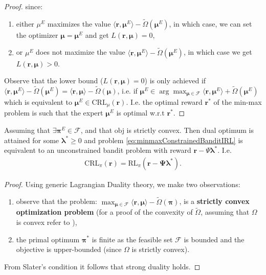 \begin{proof}
    since:
    \begin{enumerate}
        \item either $\mu^E$ maximizes the value $\langle \bm{r}, \bm{\mu}^E \rangle - \tilde{\Omega}(\bm{\mu}^E)$, in which case, we can set the optimizer $\bm{\mu} = \bm{\mu}^E$ and get $ L(\bm{r},\bm{\mu})=0$,
        \item or  $\mu^E$ does not maximize the value $\langle \bm{r}, \bm{\mu}^E\rangle - \tilde{\Omega}(\bm{\mu}^E)$, in  which case we get $ L(\bm{r},\bm{\mu})>0$.
    \end{enumerate}
    Observe that the lower bound ($ L(\bm{r},\bm{\mu})=0$) is only achieved if $\langle \bm{r}, \bm{\mu}^E\rangle - \tilde{\Omega}(\bm{\mu}^E)= \langle \bm{r}, \bm{\mu} \rangle - \tilde{\Omega}(\bm{\mu})$, i.e. if $\bm{\mu}^E \in \arg \max_{\bm{\mu} \in \mathcal{F}} \langle \bm{r}, \bm{\mu}^E \rangle + \tilde{\Omega}(\bm{\mu}^E)$ which is equivalent to $\bm{\mu}^E \in  \text{CRL}_\mu(\bm{r})$. I.e. the optimal reward $\bm{r}^*$ of the min-max problem is such that the expert $\bm{\mu}^E$ is optimal w.r.t $\bm{r}^*$.
    
\end{proof}

\begin{proposition}
    \label{prop:strong_duality}
    Assuming that $\exists \bm{\pi}^E\in\mathcal{F}$, and that $\text{obj}$ is strictly convex. Then dual optimum is attained for some $\bm{\lambda}^* \geq 0$ and problem \ref{eq:minmaxConstrainedBanditIRL} is equivalent to an unconstrained bandit problem with reward $\bm{r}-\Psi \bm{\lambda}^*$. I.e. 
    \begin{align*}
        \text{CRL}_\pi(\bm{r}) = \text{RL}_\pi(\bm{r} - \bm{\Psi} \bm{\lambda}^*).
    \end{align*}
\end{proposition}
\begin{proof}
    Using generic Lagrangian Duality theory, we make two observations:
    \begin{enumerate}
        \item observe that the problem: $\max_{\bm{\mu} \in \mathcal{F}} \langle \bm{r}, \bm{\mu} \rangle - \tilde{\Omega}(\bm{\pi})$, is a \textbf{strictly convex optimization problem} (for a proof of the convexity of $\tilde{\Omega}$, assuming that $\Omega$ is convex refer to \cite{Schlaginhaufen2023}),
        \item the primal optimum $\bm{\pi}^*$ is finite as the feasible set $\mathcal{F}$ is bounded and the objective is upper-bounded (since $\Omega$ is strictly convex).
    \end{enumerate}
    From Slater's condition it follows that strong duality holds.
\end{proof}


